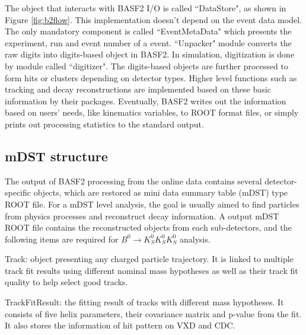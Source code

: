 The object that interacts with BASF2 I/O is called ``DataStore", as shown in Figure \ref{fig:b2flow}. This implementation doesn't depend on the event data model. The only mandatory component is called ``EventMetaData" which presents the experiment, run  and event number of a event. ``Unpacker" module converts the raw digits into digits-based object in BASF2. In simulation, digitization is done by module called ``digitizer". The digits-based objects are further processed to form hits or clusters depending on detector types. Higher level functions such as tracking and decay reconstructions are implemented based on these basic information by their packages. Eventually, BASF2 writes out the information based on users' needs, like kinematics variables, to ROOT format files, or simply prints out processing statistics to the standard output. 

\begin{comment}
In practice, BASF2 starts running when it checks there is at least one module specifying the number of events to be processed in a ``path"  from the ``steering file", then it reads in the information from DataStore in the input ROOT file, execute all the requested modules in the ``steering file" and return the time and number of events as information printed in standard output.
\end{comment}



\subsection{mDST structure}

The output of BASF2 processing from the online data contains several detector-specific objects, which are restored as mini data summary table (mDST) type ROOT file. For a mDST level analysis, the goal is usually aimed to find particles from physics processes and reconstruct decay information. A output mDST ROOT file contains the reconstructed objects from each sub-detectors, and the following items are required for $B^0 \to K_S^0  K_S^0  K_S^0$ analysis. 


\textbullet \space Track: object presenting any charged particle trajectory. It is linked to multiple track fit results using different nominal mass hypotheses as well as their track fit quality to help select good tracks.  

\textbullet \space TrackFitResult: the fitting result of tracks with different mass hypotheses. It consists of five helix parameters, their covariance matrix and p-value from the fit. It also stores the information of hit pattern on VXD and CDC. 

